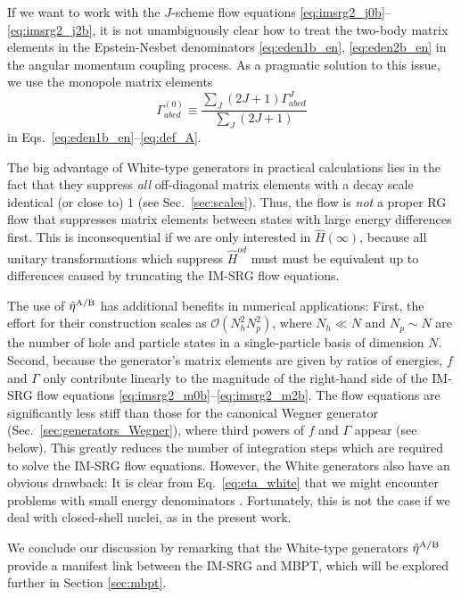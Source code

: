 If we want to work with the $J$-scheme flow equations \eqref{eq:imsrg2_j0b}--\eqref{eq:imsrg2_j2b}, it is not unambiguously clear how to treat the two-body matrix elements in the Epstein-Nesbet denominators \eqref{eq:eden1b_en}, \eqref{eq:eden2b_en} in the angular momentum coupling process. As a pragmatic solution to this issue, we use the monopole matrix elements
\begin{equation}
  \Gamma^{(0)}_{abcd}\equiv\frac{\sum_J(2J+1)\Gamma^J_{abcd}}{\sum_{J}(2J+1)}
\end{equation}
in Eqs.~\eqref{eq:eden1b_en}--\eqref{eq:def_A}. 

The big advantage of White-type generators in practical calculations lies in the fact that they suppress \emph{all} off-diagonal matrix elements with a decay scale identical (or close to) 1 (see Sec.~\ref{sec:scales}). Thus, the flow is \emph{not} a proper RG flow that suppresses matrix elements between states with large energy differences first. This is inconsequential if we are only interested in $\hat{H}(\infty)$, because all unitary transformations which suppress $\hat{H}^{od}$ must must be equivalent up to differences caused by truncating the IM-SRG flow equations.

The use of $\hat{\eta}^\text{A/B}$ has additional benefits in numerical applications: First, the effort for their construction scales as $\mathcal{O}(N_h^2N_p^2)$, where $N_h\ll N$ and $N_p\sim N$ are the number of hole and particle states in a single-particle basis of dimension $N$. Second, because the generator's matrix elements are given by ratios of energies, $f$ and $\Gamma$ only contribute linearly to the magnitude of the right-hand side of the IM-SRG flow equations \eqref{eq:imsrg2_m0b}--\eqref{eq:imsrg2_m2b}. The flow equations are significantly less stiff than those for the canonical Wegner generator (Sec.~\ref{sec:generators_Wegner}), where third powers of $f$ and $\Gamma$ appear (see below). This greatly reduces the number of integration steps which are required to solve the IM-SRG flow equations. However, the White generators also have an obvious drawback: It is clear from Eq.~\eqref{eq:eta_white} that we might encounter problems with small energy denominators \cite{Tsukiyama:2012fk,Hergert:2013ij}. Fortunately, this is not the case if we deal with closed-shell nuclei, as in the present work. 

We conclude our discussion by remarking that the White-type generators $\hat{\eta}^\text{A/B}$ provide a manifest link between the IM-SRG and MBPT, which will be explored further in Section \ref{sec:mbpt}. 

